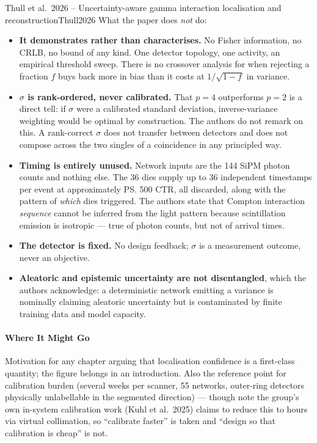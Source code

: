 \begin{papernote}{Thull et al.\ 2026 -- Uncertainty-aware gamma interaction localisation and reconstruction}{Thull2026}
What the paper does \emph{not} do:
\begin{itemize}
    \item \textbf{It demonstrates rather than characterises.} No Fisher information, no
        CRLB, no bound of any kind. One detector topology, one activity, an empirical
        threshold sweep. There is no crossover analysis for when rejecting a fraction $f$
        buys back more in bias than it costs at $1/\sqrt{1-f}$ in variance.
    \item \textbf{$\sigma$ is rank-ordered, never calibrated.} That $p = 4$ outperforms
        $p = 2$ is a direct tell: if $\sigma$ were a calibrated standard deviation,
        inverse-variance weighting would be optimal by construction. The authors do not
        remark on this. A rank-correct $\sigma$ does not transfer between detectors and
        does not compose across the two singles of a coincidence in any principled way.
    \item \textbf{Timing is entirely unused.} Network inputs are the 144 SiPM photon counts
        and nothing else. The 36 dies supply up to 36 independent timestamps per event at
        approximately \ps{500} CTR, all discarded, along with the pattern of \emph{which}
        dies triggered. The authors state that Compton interaction \emph{sequence} cannot
        be inferred from the light pattern because scintillation emission is isotropic ---
        true of photon counts, but not of arrival times.
    \item \textbf{The detector is fixed.} No design feedback; $\sigma$ is a measurement
        outcome, never an objective.
    \item \textbf{Aleatoric and epistemic uncertainty are not disentangled}, which the
        authors acknowledge: a deterministic network emitting a variance is nominally
        claiming aleatoric uncertainty but is contaminated by finite training data and
        model capacity.
\end{itemize}

\paragraph{Where It Might Go}
Motivation for any chapter arguing that localisation confidence is a first-class quantity;
the  figure belongs in an introduction. Also the reference point for calibration
burden (several weeks per scanner, 55 networks, outer-ring detectors physically
unlabellable in the segmented direction) --- though note the group's own in-system
calibration work (Kuhl et al.\ 2025) claims to reduce this to hours via virtual
collimation, so ``calibrate faster'' is taken and ``design so that calibration is cheap''
is not.


\end{papernote}
